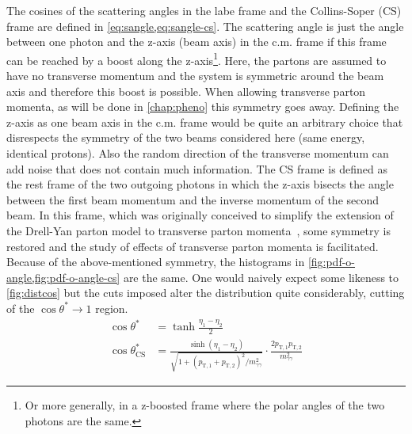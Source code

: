 The cosines of the scattering angles in the labe frame and the
Collins-Soper (CS) frame are defined in
\cref{eq:sangle,eq:sangle-cs}. The scattering angle is just the angle
between one photon and the z-axis (beam axis) in the c.m. frame if
this frame can be reached by a boost along the z-axis\footnote{Or more
  generally, in a z-boosted frame where the polar angles of the two
  photons are the same.}. Here, the partons are assumed to have no
transverse momentum and the system is symmetric around the beam axis
and therefore this boost is possible. When allowing transverse parton
momenta, as will be done in \cref{chap:pheno} this symmetry goes
away. Defining the z-axis as one beam axis in the c.m. frame would be
quite an arbitrary choice that disrespects the symmetry of the two
beams considered here (same energy, identical protons).  Also the
random direction of the transverse momentum can add noise that does
not contain much information. The CS frame is defined as the rest
frame of the two outgoing photons in which the z-axis bisects the
angle between the first beam momentum and the inverse momentum of the
second beam. In this frame, which was originally conceived to simplify
the extension of the Drell-Yan parton model to transverse parton
momenta~\cite{collins:1977an}, some symmetry is restored and the study
of effects of transverse parton momenta is facilitated. Because of the
above-mentioned symmetry, the histograms in
\cref{fig:pdf-o-angle,fig:pdf-o-angle-cs} are the same. One would
naively expect some likeness to \cref{fig:distcos} but the cuts
imposed alter the distribution quite considerably, cutting of the
\(\cos\theta^\ast\rightarrow 1\) region.
%
\begin{align}
  \cos\theta^\ast &= \tanh\frac{\eta_1 - \eta_2}{2} \label{eq:sangle}\\
  \cos\theta^*_\text{CS} &= \frac{\sinh(\eta_1 -
                           \eta_2)}{\sqrt{1+(p_{\text{T},1} + p_{\text{T},2})^2/m_{\gamma\gamma}^2}}\cdot
                          \frac{2p_{\text{T},1}p_{\text{T},2}}{m_{\gamma\gamma}^2}\label{eq:sangle-cs}
\end{align}
%
